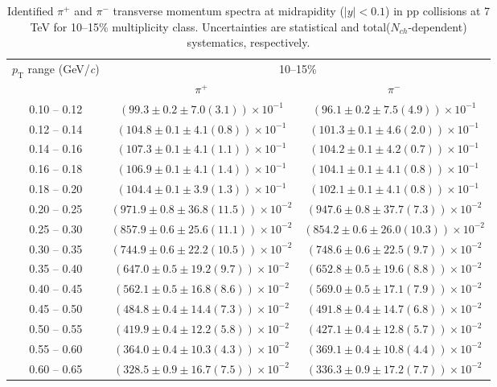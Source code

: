 \begin{table}
\caption{Identified $\pi^{+}$ and $\pi^{-}$  transverse momentum spectra at midrapidity ($|y|<0.1$) in pp collisions at 7 TeV for 10--15\% multiplicity class. Uncertainties are statistical and total($N_{ch}$-dependent) systematics, respectively.}
\label{tab:PionPlus_PionMinus_10to15}
\begin{center}
\begin{tabular}{ c | c c }
\hline
\multirow{2}{*}{$p_{\mathrm{T}}$ range (GeV/\textit{c})} & \multicolumn{2}{c}{10--15\%} \\ & $\pi^{+}$& $\pi^{-}$\\ 
\hline
0.10 -- 0.12 & $(99.3\pm0.2\pm7.0(3.1))\times10^{-1}$ & $(96.1\pm0.2\pm7.5(4.9))\times10^{-1}$ \\ 
0.12 -- 0.14 & $(104.8\pm0.1\pm4.1(0.8))\times10^{-1}$ & $(101.3\pm0.1\pm4.6(2.0))\times10^{-1}$ \\ 
0.14 -- 0.16 & $(107.3\pm0.1\pm4.1(1.1))\times10^{-1}$ & $(104.2\pm0.1\pm4.2(0.7))\times10^{-1}$ \\ 
0.16 -- 0.18 & $(106.9\pm0.1\pm4.1(1.4))\times10^{-1}$ & $(104.1\pm0.1\pm4.1(0.8))\times10^{-1}$ \\ 
0.18 -- 0.20 & $(104.4\pm0.1\pm3.9(1.3))\times10^{-1}$ & $(102.1\pm0.1\pm4.1(0.8))\times10^{-1}$ \\ 
0.20 -- 0.25 & $(971.9\pm0.8\pm36.8(11.5))\times10^{-2}$ & $(947.6\pm0.8\pm37.7(7.3))\times10^{-2}$ \\ 
0.25 -- 0.30 & $(857.9\pm0.6\pm25.6(11.1))\times10^{-2}$ & $(854.2\pm0.6\pm26.0(10.3))\times10^{-2}$ \\ 
0.30 -- 0.35 & $(744.9\pm0.6\pm22.2(10.5))\times10^{-2}$ & $(748.6\pm0.6\pm22.5(9.7))\times10^{-2}$ \\ 
0.35 -- 0.40 & $(647.0\pm0.5\pm19.2(9.7))\times10^{-2}$ & $(652.8\pm0.5\pm19.6(8.8))\times10^{-2}$ \\ 
0.40 -- 0.45 & $(562.1\pm0.5\pm16.8(8.6))\times10^{-2}$ & $(569.0\pm0.5\pm17.1(7.9))\times10^{-2}$ \\ 
0.45 -- 0.50 & $(484.8\pm0.4\pm14.4(7.3))\times10^{-2}$ & $(491.8\pm0.4\pm14.7(6.8))\times10^{-2}$ \\ 
0.50 -- 0.55 & $(419.9\pm0.4\pm12.2(5.8))\times10^{-2}$ & $(427.1\pm0.4\pm12.8(5.7))\times10^{-2}$ \\ 
0.55 -- 0.60 & $(364.0\pm0.4\pm10.3(4.3))\times10^{-2}$ & $(369.1\pm0.4\pm10.8(4.4))\times10^{-2}$ \\ 
0.60 -- 0.65 & $(328.5\pm0.9\pm16.7(7.5))\times10^{-2}$ & $(336.3\pm0.9\pm17.2(7.7))\times10^{-2}$ \\ 

\end{tabular}
\end{center}
\end{table}

